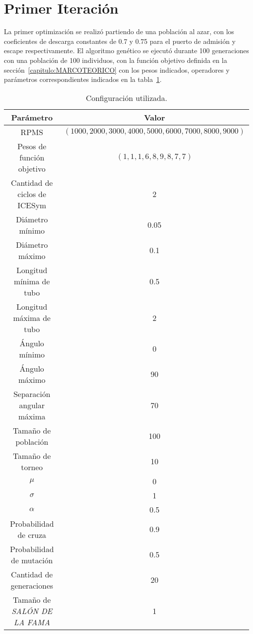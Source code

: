 
\section{Primer Iteración}
%
La primer optimización se realizó partiendo de una población al azar, con los
coeficientes de descarga constantes de 0.7 y 0.75 para el puerto de admisión y
escape respectivamente.
%
El algoritmo genético se ejecutó durante 100 generaciones con una población de
100 individuos, con la función objetivo definida en la
sección~\ref{capitulo:MARCOTEORICO} con los pesos indicados, operadores y
parámetros correspondientes indicados en la tabla~\ref{tab:config_genetico}.

\begin{table}[h]
  \centering
  \begin{tabular}{cc} \toprule
    Parámetro & Valor \\ \midrule
    RPMS & $(1000, 2000, 3000, 4000, 5000, 6000, 7000, 8000, 9000)$ \\
    Pesos de función objetivo & $(1, 1, 1, 6, 8, 9, 8, 7, 7)$ \\
    Cantidad de ciclos de ICESym & 2 \\
    Diámetro mínimo & 0.05 \\
    Diámetro máximo & 0.1 \\
    Longitud mínima de tubo & 0.5 \\
    Longitud máxima de tubo & 2 \\
    Ángulo mínimo & 0 \\
    Ángulo máximo & 90 \\
    Separación angular máxima & 70 \\
    Tamaño de población & 100 \\
    Tamaño de torneo & 10 \\
    $\mu$ & 0 \\
    $\sigma$ & 1 \\
    $\alpha$ & 0.5 \\
    Probabilidad de cruza & 0.9 \\
    Probabilidad de mutación & 0.5 \\
    Cantidad de generaciones & 20 \\
    Tamaño de \emph{SALÓN DE LA FAMA} & 1 \\ \bottomrule
    \end{tabular}
  \caption{Configuración utilizada.}\label{tab:config_genetico}
\end{table}

